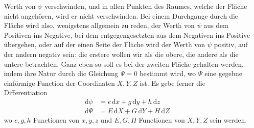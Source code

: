 Werth von \(\psi\) verschwinden, und in allen Punkten des Raumes, welche der Fläche nicht angehören, wird er nicht verschwinden. Bei einem Durchgange durch die Fläche wird also, wenigstens allgemein zu reden, der Werth von \(\psi\) aus dem Positiven ins Negative, bei dem entgegengesetzten aus dem Negativen ins Positive übergehen, oder auf der einen Seite der Fläche wird der Werth von \(\psi\) positiv, auf der andern negativ sein: die erstere wollen wir als die obere, die andere als die untere betrachten. Ganz eben so soll es bei der zweiten Fläche gehalten werden, indem ihre Natur durch die Gleichung \(\Psi=0\) bestimmt wird, wo \(\Psi\) eine gegebne einförmige Function der Coordinaten \(X,Y,Z\) ist. Es gebe ferner die Differentiation
\[
\begin{aligned}
\mathrm{d}\psi&=e\,\mathrm{d}x+g\,\mathrm{d}y+h\,\mathrm{d}z\\
\mathrm{d}\Psi&=E\,\mathrm{d}X+G\,\mathrm{d}Y+H\,\mathrm{d}Z
\end{aligned}
\]
\noindent wo \(e,g,h\) Functionen von \(x,y,z\) und \(E,G,H\) Functionen von \(X,Y,Z\) sein werden.


